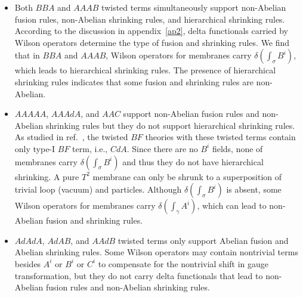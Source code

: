\documentclass[11pt,nofootinbib,preprint]{revtex4-1}
\begin{document}
\begin{itemize}
\item Both $BBA$ and $AAAB$ twisted terms simultaneously support non-Abelian fusion rules, non-Abelian shrinking rules, and hierarchical shrinking rules. According to the discussion in appendix~\ref{ap2}, delta functionals carried by Wilson operators determine the type of fusion and shrinking rules. We find that in $BBA$ and $AAAB$, Wilson operators for membranes carry $\delta \left( \int_{\sigma}{B^i} \right) $, which  leads to hierarchical shrinking rules. The presence of hierarchical shrinking rules indicates that some fusion and shrinking rules are non-Abelian.

\item $AAAAA$, $AAAdA$, and $AAC$ support non-Abelian fusion rules and non-Abelian shrinking rules but they do not support hierarchical shrinking rules. As studied in ref.~\cite{Zhang:2021ycl}, the twisted $BF$ theories with these twisted terms contain only type-I $BF$ term, i.e., $CdA$. Since there are no $B^i$ fields, none of membranes carry $\delta \left( \int_{\sigma}{B^i} \right) $ and thus they do not have hierarchical shrinking. A pure $T^2$ membrane can only be shrunk to a superposition of  trivial loop (vacuum) and particles. Although $\delta \left( \int_{\sigma}{B^i} \right) $ is absent, some Wilson operators for membranes carry $\delta \left( \int_{\gamma}{A^i} \right) $, which can lead to non-Abelian fusion and shrinking rules.

\item $AdAdA$, $AdAB$, and $AAdB$ twisted terms only support Abelian fusion and Abelian shrinking rules. Some Wilson operators may contain nontrivial terms besides $A^i$ or $B^i$ or $C^i$ to compensate for the nontrivial shift in gauge transformation, but they do not carry delta functionals that lead to non-Abelian fusion rules and non-Abelian shrinking rules.
\end{itemize}
\end{document}
